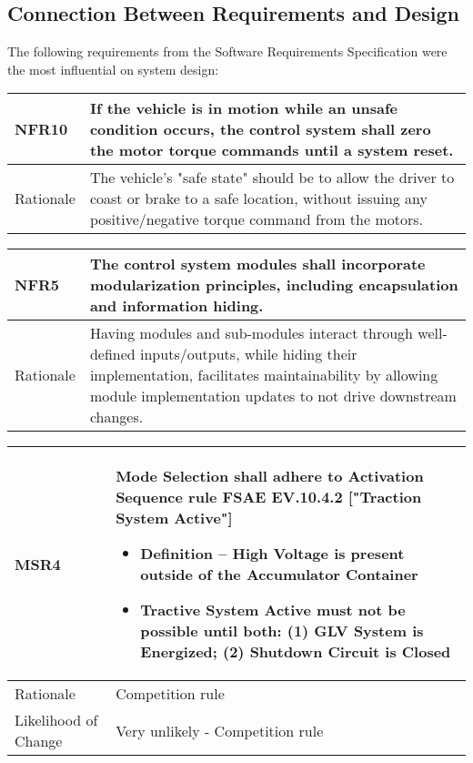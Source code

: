 \documentclass[12pt, titlepage]{article}
\newcommand{\tableVspace}{5mm}
\newcommand{\ReqColA}{0.13\textwidth}
\newcommand{\ReqColB}{0.82\textwidth}
\begin{document}
\subsection{Connection Between Requirements and Design} \label{SecConnection}

The following requirements from the Software Requirements Specification were the most influential on system design:

\vspace{\tableVspace}\noindent
\begin{tabular}{| p{\ReqColA} | p{\ReqColB}|}
\hline
\rowcolor[gray]{0.9}
NFR10 & If the vehicle is in motion while an unsafe condition occurs, the control system shall zero the motor torque commands until a system reset.\\
\hline
Rationale & The vehicle's "safe state" should be to allow the driver to coast or brake to a safe location, without issuing any positive/negative torque command from the motors.\\
\hline
\end{tabular}

\vspace{\tableVspace}\noindent
\begin{tabular}{| p{\ReqColA} | p{\ReqColB}|}
\hline
\rowcolor[gray]{0.9}
NFR5 & The control system modules shall incorporate modularization principles, including encapsulation and information hiding.\\
\hline
Rationale & Having modules and sub-modules interact through well-defined inputs/outputs, while hiding their implementation, facilitates maintainability by allowing module implementation updates to not drive downstream changes.  \\
\hline
\end{tabular}

\vspace{\tableVspace}
\noindent
\begin{tabular}{| p{\ReqColA} | p{\ReqColB}|}
\hline
\rowcolor[gray]{0.9}
MSR4 & Mode Selection shall adhere to Activation Sequence rule FSAE EV.10.4.2 ["Traction System Active"] 
\begin{itemize}
    \item Definition – High Voltage is present outside of the Accumulator Container
    \item Tractive System Active must not be possible until both: (1) GLV System is Energized; (2) Shutdown Circuit is Closed
\end{itemize} \\
\hline
Rationale & Competition rule\\
\hline
Likelihood of Change & Very unlikely - Competition rule \\
\hline
\end{tabular} 
\end{document}
